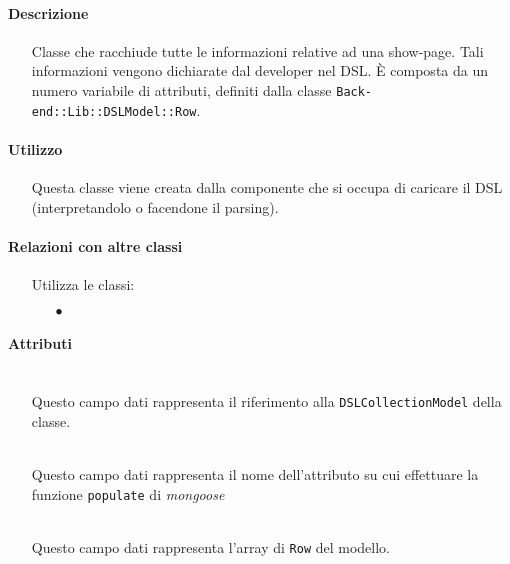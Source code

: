 \paragraph*{Descrizione}
\begin{itemize}
\item[] Classe che racchiude tutte le informazioni relative ad una show-page. Tali informazioni vengono dichiarate dal developer nel DSL. È composta da un numero variabile di attributi, definiti dalla classe \texttt{Back-end::Lib::DSLModel::Row}.
\end{itemize}

\paragraph*{Utilizzo}
\begin{itemize}
\item[] Questa classe viene creata dalla componente che si occupa di caricare il DSL (interpretandolo o facendone il parsing).
\end{itemize}

\paragraph*{Relazioni con altre classi}
\begin{itemize}


\item[] Utilizza le classi:
\begin{itemize}
\item[$\bullet$] 
\end{itemize}
\end{itemize}

\paragraph*{Attributi}
\begin{itemize}
\item[]  \\ Questo campo dati rappresenta il riferimento alla \texttt{DSLCollectionModel} della classe.
\item[]  \\ Questo campo dati rappresenta il nome dell'attributo su cui effettuare la funzione \texttt{populate} di \textit{mongoose}
\item[]  \\ Questo campo dati rappresenta l'array di \texttt{Row} del modello.
\end{itemize}

